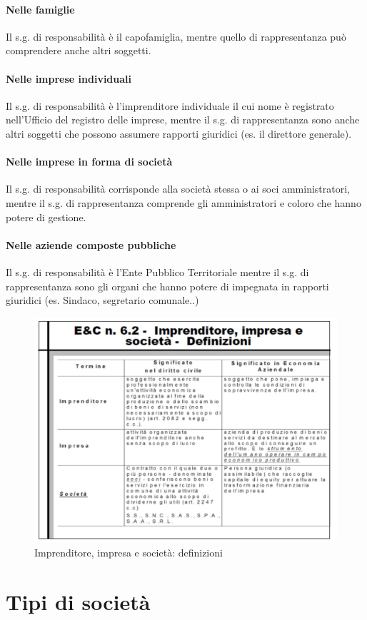 \documentclass{report}
\begin{document}
	\paragraph{Nelle famiglie}
	Il s.g. di responsabilità è il capofamiglia, mentre quello di rappresentanza può comprendere anche altri soggetti.
	\paragraph{Nelle imprese individuali}
	Il s.g. di responsabilità è l'imprenditore individuale il cui nome è registrato nell'Ufficio del registro delle imprese, mentre il s.g. di rappresentanza sono anche altri soggetti che possono assumere rapporti giuridici (es. il direttore generale).
	\paragraph{Nelle imprese in forma di società}
	Il s.g. di responsabilità corrisponde alla società stessa o ai soci amministratori, mentre il s.g. di rappresentanza comprende gli amministratori e coloro che hanno potere di gestione.
	\paragraph{Nelle aziende composte pubbliche}
	Il s.g. di responsabilità è l'Ente Pubblico Territoriale mentre il s.g. di rappresentanza sono gli organi che hanno potere di impegnata in rapporti giuridici (es. Sindaco, segretario comunale..)
	\begin{figure}[h]
		\centering
		\includegraphics[width=0.7\linewidth]{imprenditore-impresa-societa}
		\caption{Imprenditore, impresa e società: definizioni}
		\label{fig:imprenditore-impresa-societa}
	\end{figure}
	\section{Tipi di società}
\end{document}
